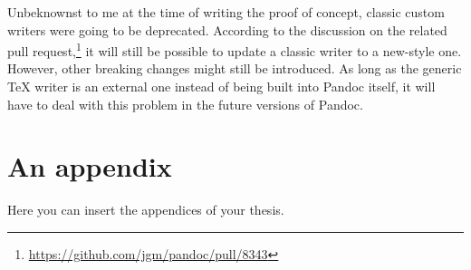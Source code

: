 \documentclass[
  digital,     %
  oneside,     %
  nosansbold,  %
  nocolorbold, %
  lof,         %
  nolot,       %
]{fithesis4}
\begin{document}
Unbeknownst to me at the time of writing the proof of concept, classic custom writers were going to be deprecated. According to the discussion on the related pull request,\footnote{\url{https://github.com/jgm/pandoc/pull/8343}} it will still be possible to update a classic writer to a new-style one. However, other breaking changes might still be introduced. As long as the generic \TeX{} writer is an external one instead of being built into Pandoc itself, it will have to deal with this problem in the future versions of Pandoc.

\printbibliography[heading=bibintoc] %

\makeatletter\thesis@blocks@clear\makeatother

\appendix %
\chapter{An appendix}
Here you can insert the appendices of your thesis.
\end{document}
